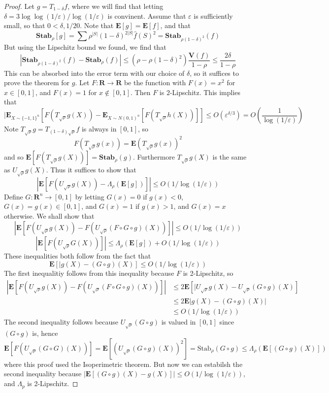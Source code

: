 \begin{proof}
    Let $g = T_{1 - \delta} f$, where we will find that letting $\delta = 3 \log \log (1/\varepsilon)/\log(1/\varepsilon)$ is convinent. Assume that $\varepsilon$ is sufficiently small, so that $0 < \delta , 1/20$. Note that $\mathbf{E}[g] = \mathbf{E}[f]$, and that
    \[ \mathbf{Stab}_\rho[g] = \sum \rho^{|S|} (1 - \delta)^{2|S|} \widehat{f}(S)^2 = \mathbf{Stab}_{\rho(1 - \delta)^2}(f) \]
    But using the Lipschitz bound we found, we find that
    \[ |\mathbf{Stab}_{\rho(1-\delta)^2}(f) - \mathbf{Stab}_\rho(f) | \leq (\rho - \rho(1 - \delta)^2) \frac{\mathbf{V}(f)}{1 - \rho} \leq \frac{2 \delta}{1 - \rho} \]
    This can be absorbed into the error term with our choice of $\delta$, so it suffices to prove the theorem for $g$. Let $F: \mathbf{R} \to \mathbf{R}$ be the function with $F(x) = x^2$ for $x \in [0,1]$, and $F(x) = 1$ for $x \not \in [0,1]$. Then $F$ is $2$-Lipschitz. This implies that
    \[| \mathbf{E}_{X \sim \{ -1, 1 \}^n} [F(T_{\sqrt{\rho}} g(X)) - \mathbf{E}_{X \sim N(0,1)^n}[F(T_{\sqrt{\rho}} h(X))]] \leq O(\varepsilon^{\delta/3}) = O\left(\frac{1}{\log(1/\varepsilon)} \right) \]
    Note $T_{\sqrt{\rho}} g = T_{(1-\delta)\sqrt{\rho}} f$ is always in $[0,1]$, so
    \[ F(T_{\sqrt{\rho}} g(x)) = \mathbf{E}(T_{\sqrt{\rho}} g(x))^2 \]
    and so $\mathbf{E}[F(T_{\sqrt{\rho}} g(X))] = \mathbf{Stab}_\rho(g)$. Furthermore $T_{\sqrt{\rho}} g(X)$ is the same as $U_{\sqrt{\rho}} g(X)$. Thus it suffices to show that
    \[ |\mathbf{E}[F(U_{\sqrt{\rho}} g(X)) - \Lambda_\rho(\mathbf{E}[g])]| \leq O(1/\log(1/\varepsilon)) \]
    Define $G: \mathbf{R}^n \to [0,1]$ by letting $G(x) = 0$ if $g(x) < 0$, $G(x) = g(x) \in [0,1]$, and $G(x) = 1$ if $g(x) > 1$, and $G(x) = x$ otherwise. We shall show that
    \[ \left| \mathbf{E}[F(U_{\sqrt{\rho}} g(X)) - F(U_{\sqrt{\rho}} (F \circ G \circ g) (X))] \right| \leq O(1/\log(1/\varepsilon)) \]
    \[ |\mathbf{E}[F(U_{\sqrt{\rho}} G(X))]| \leq \Lambda_\rho(\mathbf{E}[g]) + O(1/\log(1/\varepsilon)) \]
    These inequalities both follow from the fact that
    \[ \mathbf{E}[|g(X) - (G \circ g)(X)] \leq O(1/\log(1/\varepsilon)) \]
    The first inequalitiy follows from this inequality because $F$ is 2-Lipschitz, so
    \begin{align*}
        \left| \mathbf{E}[F(U_{\sqrt{\rho}} g(X)) - F(U_{\sqrt{\rho}} (F \circ G \circ g) (X))] \right| &\leq 2 \mathbf{E}[|U_{\sqrt{\rho}} g(X) - U_{\sqrt{\rho}} (G \circ g)(X)]\\
        &\leq 2 \mathbf{E} |g(X) - (G \circ g)(X)|\\
        &\leq O(1/\log(1/\varepsilon))
    \end{align*}
    The second inequality follows because $U_{\sqrt{\rho}} (G \circ g)$ is valued in $[0,1]$ since $(G \circ g)$ is, hence
    \[ \mathbf{E}[F(U_{\sqrt{\rho}} (G \circ G)(X))] = \mathbf{E}[(U_{\sqrt{\rho}} (G \circ g)(X))^2] = \text{Stab}_\rho(G \circ g) \leq \Lambda_\rho(\mathbf{E}[(G \circ g)(X)]) \]
    where this proof used the Isoperimetric theorem. But now we can estabilsh the second inequality because $|\mathbf{E}[(G \circ g)(X) - g(X)]| \leq O(1/\log(1/\varepsilon))$, and $\Lambda_p$ is 2-Lipschitz.


\end{proof}
